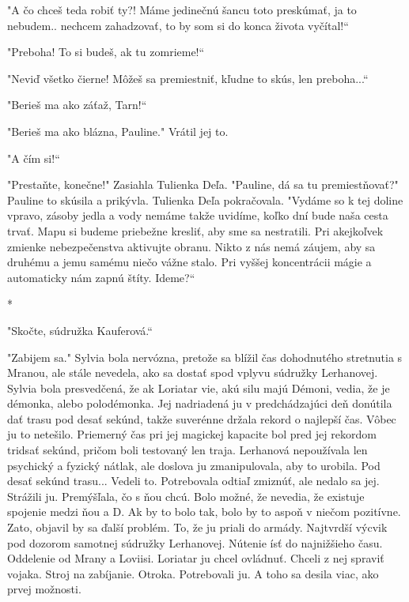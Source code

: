 \documentclass{book}
\begin{document}
"$ $A čo chceš teda robiť ty?! Máme jedinečnú šancu toto preskúmať, ja to nebudem.. nechcem zahadzovať, to by som si do konca života vyčítal!“

"$ $Preboha! To si budeš, ak tu zomrieme!“

"$ $Neviď všetko čierne! Môžeš sa premiestniť, kľudne to skús, len preboha...“

"$ $Berieš ma ako záťaž, Tarn!“

"$ $Berieš ma ako blázna, Pauline."$ $ Vrátil jej to.

"$ $A čím si!“

"$ $Prestaňte, konečne!"$ $ Zasiahla Tulienka Deľa. "$ $Pauline, dá sa tu premiestňovať?"$ $ Pauline to skúsila a prikývla. Tulienka Deľa pokračovala. "$ $Vydáme so k tej doline vpravo, zásoby jedla a vody nemáme takže uvidíme, koľko dní bude naša cesta trvať. Mapu si budeme priebežne kresliť, aby sme sa nestratili. Pri akejkoľvek zmienke nebezpečenstva aktivujte obranu. Nikto z nás nemá záujem, aby sa druhému a jemu samému niečo vážne stalo. Pri vyššej koncentrácii mágie a automaticky nám zapnú štíty. Ideme?“

\begin{center}
*
\end{center}

"$ $Skočte, súdružka Kauferová.“

"$ $Zabijem sa."$ $ Sylvia bola nervózna, pretože sa blížil čas dohodnutého stretnutia s Mranou, ale stále nevedela, ako sa dostať spod vplyvu súdružky Lerhanovej. Sylvia bola presvedčená, že ak Loriatar vie, akú silu majú Démoni, vedia, že je démonka, alebo polodémonka. Jej nadriadená ju v predchádzajúci deň donútila dať trasu pod desať sekúnd, takže suverénne držala rekord o najlepší čas. Vôbec ju to netešilo. Priemerný čas pri jej magickej kapacite bol pred jej rekordom tridsať sekúnd, pričom boli testovaný len traja. Lerhanová nepoužívala len psychický a fyzický nátlak, ale doslova ju zmanipulovala, aby to urobila. Pod desať sekúnd trasu... Vedeli to. Potrebovala odtiaľ zmiznúť, ale nedalo sa jej. Strážili ju. Premýšľala, čo s ňou chcú. Bolo možné, že nevedia, že existuje spojenie medzi ňou a D. Ak by to bolo tak, bolo by to aspoň v niečom pozitívne. Zato, objavil by sa ďalší problém. To, že ju priali do armády. Najtvrdší výcvik pod dozorom samotnej súdružky Lerhanovej. Nútenie ísť do najnižšieho času. Oddelenie od Mrany a Loviisi. Loriatar ju chcel ovládnuť. Chceli z nej spraviť vojaka. Stroj na zabíjanie. Otroka. Potrebovali ju. A toho sa desila viac, ako prvej možnosti.
\end{document}
